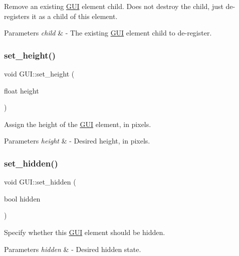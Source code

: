 Remove an existing \mbox{\hyperlink{class_g_u_i}{G\+UI}} element child. Does not destroy the child, just de-\/registers it as a child of this element. 
\begin{DoxyParams}{Parameters}
{\em child} & -\/ The existing \mbox{\hyperlink{class_g_u_i}{G\+UI}} element child to de-\/register. \\
\hline
\end{DoxyParams}
\mbox{\label{class_g_u_i_a10a086b9e69595a9d6da48eb6d20dbc1}} 
\subsubsection{\texorpdfstring{set\+\_\+height()}{set\_height()}}
{\footnotesize\ttfamily void G\+U\+I\+::set\+\_\+height (\begin{DoxyParamCaption}\item[{float}]{height }\end{DoxyParamCaption})}

Assign the height of the \mbox{\hyperlink{class_g_u_i}{G\+UI}} element, in pixels. 
\begin{DoxyParams}{Parameters}
{\em height} & -\/ Desired height, in pixels. \\
\hline
\end{DoxyParams}
\mbox{\label{class_g_u_i_a6400061907f3bba6fa465238e4d94ed1}} 
\subsubsection{\texorpdfstring{set\+\_\+hidden()}{set\_hidden()}}
{\footnotesize\ttfamily void G\+U\+I\+::set\+\_\+hidden (\begin{DoxyParamCaption}\item[{bool}]{hidden }\end{DoxyParamCaption})\hspace{0.3cm}{\ttfamily [virtual]}}

Specify whether this \mbox{\hyperlink{class_g_u_i}{G\+UI}} element should be hidden. 
\begin{DoxyParams}{Parameters}
{\em hidden} & -\/ Desired hidden state. \\
\hline
\end{DoxyParams}


